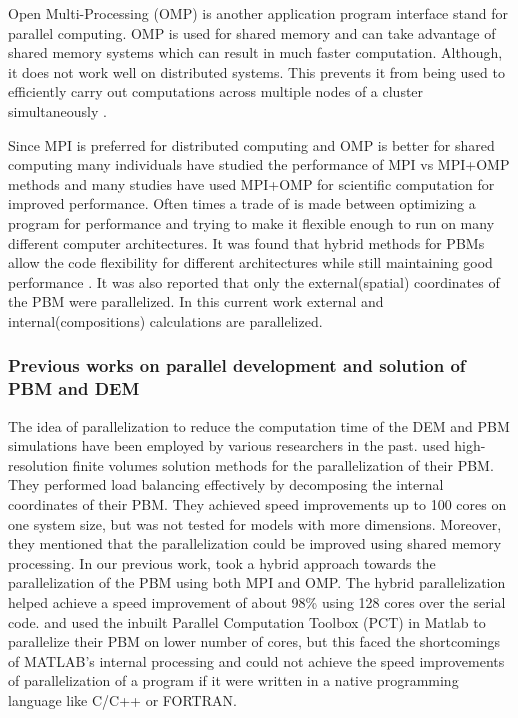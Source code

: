 \documentclass[preprint,11pt,authoryear]{elsarticle}
\begin{document}
Open Multi-Processing (OMP) is another application program interface stand for parallel 
computing. OMP is used for shared memory and can take advantage of shared memory systems which 
can result in much faster computation. Although, it does not work well on distributed systems. This 
prevents it from being used to efficiently carry out computations across multiple nodes of a cluster 
simultaneously \citep{Jin2011}. 

Since MPI is preferred for distributed computing and OMP is better for shared computing many 
individuals have studied the performance of MPI vs MPI+OMP methods and many studies have used 
MPI+OMP for scientific computation for improved performance. Often times a trade of is made 
between optimizing a program for performance and trying to make it flexible enough to run on many 
different computer architectures. It was found that hybrid methods for PBMs allow the code 
flexibility for different architectures while still maintaining good performance \citep{Bettencourt2017}.  
It was also reported that only the external(spatial) coordinates of the PBM were parallelized. 
In this current work external and internal(compositions) calculations are parallelized. 

\subsubsection{Previous works on parallel development and solution of PBM and DEM}
The idea of parallelization to reduce the computation time of the DEM and PBM simulations have 
been employed by various researchers in the past. \cite{Gunawan2008} used high-resolution 
finite volumes solution methods for the parallelization of their PBM. They performed load 
balancing effectively by decomposing the internal coordinates of their PBM. They achieved 
speed improvements up to 100 cores on one system size, but was not tested for models 
with more dimensions. Moreover, they mentioned that the parallelization could be 
improved using shared memory processing. 
In our previous work, \cite{Bettencourt2017} took a 
hybrid approach towards the parallelization of the PBM using both MPI and OMP. 
The hybrid parallelization helped achieve a speed improvement of about 98\% using 
128 cores over the serial code. 
\cite{Prakash2013a} and \cite{Prakash2013b} used the inbuilt Parallel Computation 
Toolbox (PCT) in Matlab \citep{pctMatlab} to parallelize their PBM on lower number 
of cores, but this faced the shortcomings of MATLAB's internal processing and 
could not achieve the speed improvements of parallelization of a program if 
it were written in a native programming language like C/C++ or FORTRAN. 
\end{document}
